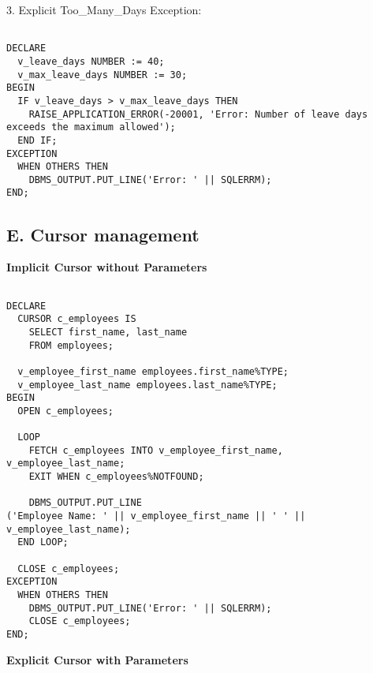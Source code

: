 \documentclass[11pt]{article} %
\begin{document}
3. Explicit Too\_Many\_Days Exception:

\begin{small}
\begin{verbatim}

DECLARE
  v_leave_days NUMBER := 40;
  v_max_leave_days NUMBER := 30;
BEGIN
  IF v_leave_days > v_max_leave_days THEN
    RAISE_APPLICATION_ERROR(-20001, 'Error: Number of leave days exceeds the maximum allowed');
  END IF;
EXCEPTION
  WHEN OTHERS THEN
    DBMS_OUTPUT.PUT_LINE('Error: ' || SQLERRM);
END;

\end{verbatim}
\end{small}

\subsection*{E. Cursor management}

\textbf{Implicit Cursor without Parameters}

\begin{small}
\begin{verbatim}

DECLARE
  CURSOR c_employees IS
    SELECT first_name, last_name
    FROM employees;
  
  v_employee_first_name employees.first_name%TYPE;
  v_employee_last_name employees.last_name%TYPE;
BEGIN
  OPEN c_employees;
  
  LOOP
    FETCH c_employees INTO v_employee_first_name, v_employee_last_name;
    EXIT WHEN c_employees%NOTFOUND;
    
    DBMS_OUTPUT.PUT_LINE
('Employee Name: ' || v_employee_first_name || ' ' || v_employee_last_name);
  END LOOP;
  
  CLOSE c_employees;
EXCEPTION
  WHEN OTHERS THEN
    DBMS_OUTPUT.PUT_LINE('Error: ' || SQLERRM);
    CLOSE c_employees;
END;

\end{verbatim}
\end{small}

\textbf{Explicit Cursor with Parameters}
\end{document}
